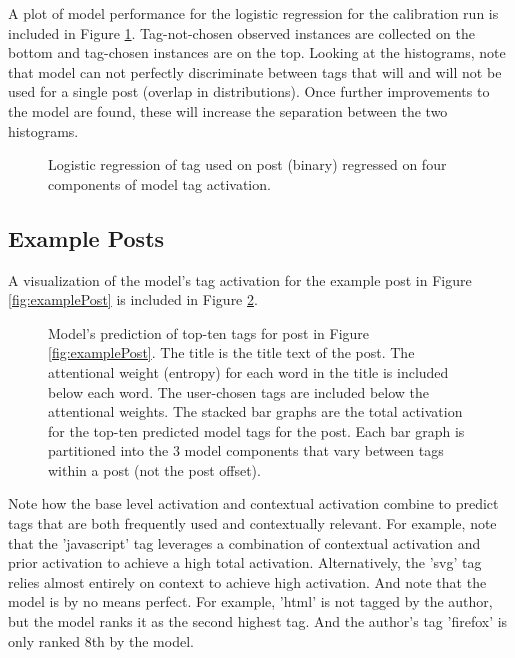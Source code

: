 \documentclass[10pt,letterpaper]{article}
\begin{document}
A plot of model performance for the logistic regression for the calibration run is included in Figure \ref{fig:logReg}.
Tag-not-chosen observed instances are collected on the bottom and tag-chosen instances are on the top.
Looking at the histograms, note that model can not perfectly discriminate between tags that will and will not be used for a single post (overlap in distributions).
Once further improvements to the model are found, these will increase the separation between the two histograms.

\begin{figure}[ht]
  \centering
  \caption{
    Logistic regression of tag used on post (binary) regressed on four components of model tag activation.
  }
  \label{fig:logReg}
\end{figure}

\subsection{Example Posts}

A visualization of the model's tag activation for the example post in Figure \ref{fig:examplePost} is included in Figure \ref{fig:modelPost}.

\begin{figure}[ht]
  \centering
  \caption{
    Model's prediction of top-ten tags for post in Figure \ref{fig:examplePost}.
    The title is the title text of the post.
    The attentional weight (entropy) for each word in the title is included below each word.
    The user-chosen tags are included below the attentional weights.
    The stacked bar graphs are the total activation for the top-ten predicted model tags for the post.
    Each bar graph is partitioned into the 3 model components that vary between tags within a post (not the post offset).
}
  \label{fig:modelPost}
\end{figure}

Note how the base level activation and contextual activation combine to predict tags that are both frequently used and contextually relevant.
For example, note that the 'javascript' tag leverages a combination of contextual activation and prior activation to achieve a high total activation.
Alternatively, the 'svg' tag relies almost entirely on context to achieve high activation.
And note that the model is by no means perfect.
For example, 'html' is not tagged by the author, but the model ranks it as the second highest tag.
And the author's tag 'firefox' is only ranked 8th by the model.
\end{document}
